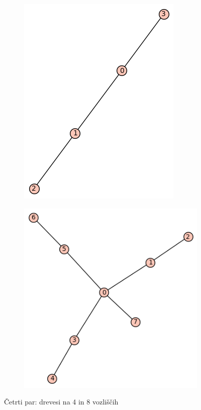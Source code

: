 \documentclass[12pt, a4paper]{article}
\begin{document}
\begin{center}
\begin{figure}[!htb]
\centering
\begin{subfigure}{0.5\textwidth}
  \centering
  \includegraphics[width=0.4\linewidth]{t-3}
\end{subfigure}%
\begin{subfigure}{0.5\textwidth}
  \centering
  \includegraphics[width=0.5\linewidth]{t-44}
\end{subfigure}
\caption{Četrti par: drevesi na 4 in 8 vozliščih}
\label{fig:test}
\end{figure}
\end{center}
\end{document}
